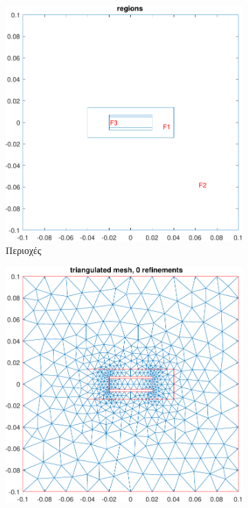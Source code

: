 \documentclass[10pt, letterpaper]{article}
\begin{document}
\begin{figure}[h!]
  \centering
  \begin{subfigure}[b]{0.3\textwidth}
      \centering
      \includegraphics[width=\textwidth]{capacitor_regions_domain:5.pdf}
      \caption{Περιοχές}
      \label{fig:capacitor_regions}
  \end{subfigure}
  \hfill
  \begin{subfigure}[b]{0.3\textwidth}
      \centering
      \includegraphics[width=\textwidth]{capacitor_mesh_0_domain:5.pdf}

\end{subfigure}
\end{figure}
\end{document}
